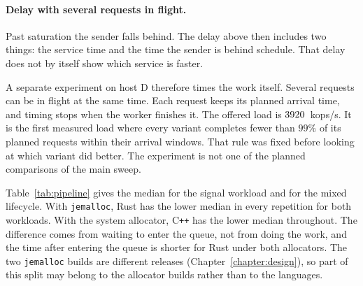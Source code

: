 \documentclass[english,oneside,a4paper,censored,csm,software-track-2020]{HYthesisML}
\begin{document}
\paragraph{Delay with several requests in flight.}
Past saturation the sender falls behind. The delay above then includes two
things: the service time and the time the sender is behind schedule. That
delay does not by itself show which service is faster.

A separate experiment on host D therefore times the work itself. Several
requests can be in flight at the same time. Each request keeps its planned
arrival time, and timing stops when the worker finishes it. The offered load
is $3920$~kops/s. It is the first measured load where every
variant completes fewer than $99\%$ of its planned requests within their
arrival windows. That rule was fixed before looking at which variant did
better. The experiment is not one of the planned comparisons of the main
sweep.

Table~\ref{tab:pipeline} gives the median for the signal workload and for the
mixed lifecycle. With \texttt{jemalloc}, Rust has the lower median in every
repetition for both workloads. With the system allocator, C\texttt{++} has
the lower median throughout. The difference comes from waiting to enter the
queue, not from doing the work, and the time after entering the queue is shorter
for Rust under both allocators. The two \texttt{jemalloc} builds are different
releases (Chapter~\ref{chapter:design}), so part of this split may belong to the
allocator builds rather than to the languages.
\end{document}
